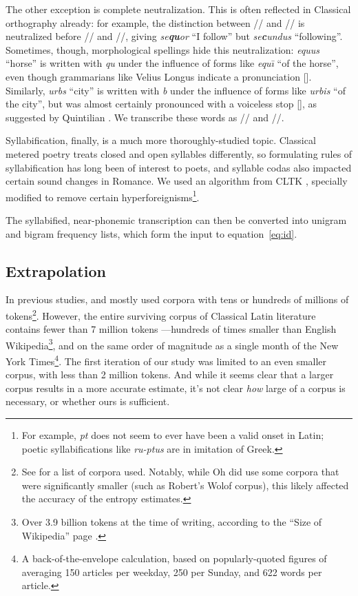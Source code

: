 \documentclass[12pt,twoside]{article}
\newcommand{\ipa}[1]{/\textipa{#1}/}
\newcommand{\ipab}[1]{[\textipa{#1}]}
\begin{document}
The other exception is complete neutralization. This is often reflected in Classical orthography already: for example, the distinction between \ipa{k} and \ipa{k\super{w}} is neutralized before \ipa{u} and \ipa{u:}, giving \emph{se\textbf{qu}or} ``I follow'' but \emph{se\textbf{c}undus} ``following''. Sometimes, though, morphological spellings hide this neutralization: \emph{equus} ``horse'' is written with \emph{qu} under the influence of forms like \emph{equ\=\i} ``of the horse'', even though grammarians like Velius Longus \citep[59.2-8]{longus} indicate a pronunciation \ipab{ekus}. Similarly, \emph{urbs} ``city'' is written with \emph{b} under the influence of forms like \emph{urbis} ``of the city'', but was almost certainly pronounced with a voiceless stop \ipab{urps}, as suggested by Quintilian \citep[I.7.7]{quintilian}. We transcribe these words as \ipa{ekus} and \ipa{urps}.

Syllabification, finally, is a much more thoroughly-studied topic. Classical metered poetry treats closed and open syllables differently, so formulating rules of syllabification has long been of interest to poets, and syllable codas also impacted certain sound changes in Romance. We used an algorithm from CLTK \citep{cltk}, specially modified to remove certain hyperforeignisms\footnote{For example, \emph{pt} does not seem to ever have been a valid onset in Latin; poetic syllabifications like \emph{ru-ptus} are in imitation of Greek.}.

The syllabified, near-phonemic transcription can then be converted into unigram and bigram frequency lists, which form the input to equation~\ref{eq:id}.

\subsection{Extrapolation}

In previous studies, \citet{coupé} and \citet{oh} mostly used corpora with tens or hundreds of millions of tokens\footnote{See \cite[30-31]{oh} for a list of corpora used. Notably, while Oh did use some corpora that were significantly smaller (such as Robert's Wolof corpus), this likely affected the accuracy of the entropy estimates.}. However, the entire surviving corpus of Classical Latin literature contains fewer than 7 million tokens \citep{phi}---hundreds of times smaller than English Wikipedia\footnote{Over 3.9 billion tokens at the time of writing, according to the ``Size of Wikipedia'' page \citep{wiki}.}, and on the same order of magnitude as a single month of the New York Times\footnote{A back-of-the-envelope calculation, based on popularly-quoted figures of averaging 150 articles per weekday, 250 per Sunday, and 622 words per article.}. The first iteration of our study was limited to an even smaller corpus, with less than 2 million tokens. And while it seems clear that a larger corpus results in a more accurate estimate, it's not clear \emph{how} large of a corpus is necessary, or whether ours is sufficient.
\end{document}
